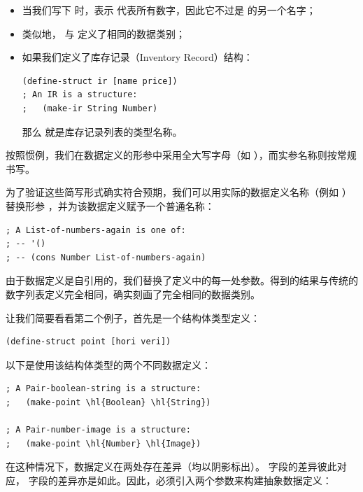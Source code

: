\begin{itemize}
  \item 当我们写下  时，表示  代表所有数字，因此它不过是  的另一个名字；
  \item 类似地， 与  定义了相同的数据类别；
  \item 如果我们定义了库存记录（Inventory Record）结构：
\begin{lstlisting}[language=BSL]
(define-struct ir [name price])
; An IR is a structure:
;   (make-ir String Number)
\end{lstlisting}
    那么 \code{[List-of IR]} 就是库存记录列表的类型名称。
\end{itemize}

按照惯例，我们在数据定义的形参中采用全大写字母（如 ），而实参名称则按常规书写。

为了验证这些简写形式确实符合预期，我们可以用实际的数据定义名称（例如 ）替换形参 ，并为该数据定义赋予一个普通名称：

\begin{lstlisting}[language=BSL]
; A List-of-numbers-again is one of:
; -- '()
; -- (cons Number List-of-numbers-again)
\end{lstlisting}

由于数据定义是自引用的，我们替换了定义中的每一处参数。得到的结果与传统的数字列表定义完全相同，确实刻画了完全相同的数据类别。

让我们简要看看第二个例子，首先是一个结构体类型定义：

\begin{lstlisting}[language=BSL]
(define-struct point [hori veri])
\end{lstlisting}

以下是使用该结构体类型的两个不同数据定义：

\begin{stepperbox}
\begin{Verbatim}[commandchars=\\\{\}, fontsize=\footnotesize]
; A Pair-boolean-string is a structure:
;   (make-point \hl{Boolean} \hl{String})

; A Pair-number-image is a structure:
;   (make-point \hl{Number} \hl{Image})
\end{Verbatim}
\end{stepperbox}

在这种情况下，数据定义在两处存在差异（均以阴影标出）。 字段的差异彼此对应， 字段的差异亦是如此。因此，必须引入两个参数来构建抽象数据定义：

